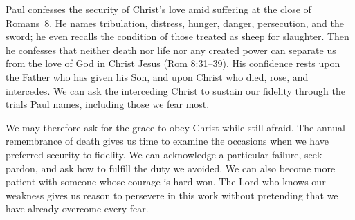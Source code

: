 Paul confesses the security of Christ's love amid suffering at the close of Romans~8. He names tribulation, distress, hunger, danger, persecution, and the sword; he even recalls the condition of those treated as sheep for slaughter. Then he confesses that neither death nor life nor any created power can separate us from the love of God in Christ Jesus (Rom 8:31--39). His confidence rests upon the Father who has given his Son, and upon Christ who died, rose, and intercedes. We can ask the interceding Christ to sustain our fidelity through the trials Paul names, including those we fear most.

We may therefore ask for the grace to obey Christ while still afraid. The annual remembrance of death gives us time to examine the occasions when we have preferred security to fidelity. We can acknowledge a particular failure, seek pardon, and ask how to fulfill the duty we avoided. We can also become more patient with someone whose courage is hard won. The Lord who knows our weakness gives us reason to persevere in this work without pretending that we have already overcome every fear.

